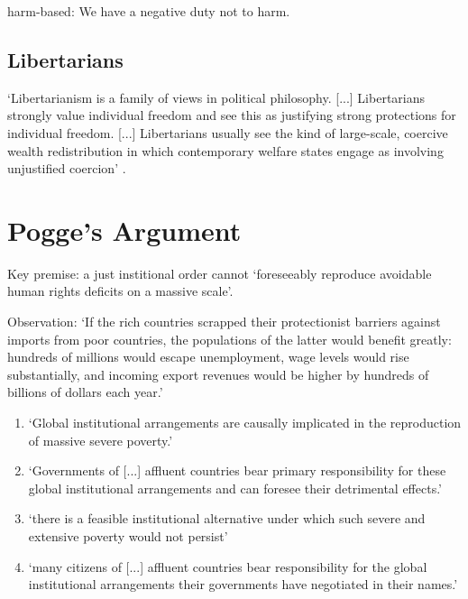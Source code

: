 \documentclass[12pt]{extarticle}
\begin{document}
\begin{multicols*}{3}
harm-based: We have a negative duty not to harm.


\subsection{Libertarians}
‘Libertarianism is a family of views in political philosophy.
[...] Libertarians strongly value individual freedom and see this as justifying
strong protections for individual freedom.
[...] Libertarians usually see the kind of large-scale, coercive wealth
redistribution in which contemporary welfare states engage as involving
unjustified coercion’
\citep{vandervossen:2019_libertarianism}.


 
\section{Pogge’s Argument}
 
Key premise: a just institional order cannot ‘foreseeably reproduce avoidable human rights deficits on a massive scale’.

Observation: ‘If the rich countries scrapped their protectionist barriers against 
imports from poor countries, the populations of the latter would 
benefit greatly: hundreds of millions would escape unemployment, 
wage levels would rise substantially, and incoming export revenues 
would be higher by hundreds of billions of dollars each year.’


\begin{enumerate}

\item ‘Global institutional arrangements
are causally implicated in the reproduction of massive severe poverty.’
 
\item ‘Governments of [...] affluent countries bear primary responsibility for these
global institutional arrangements and can foresee their detrimental
effects.’
 
\item ‘there is a feasible institutional alternative under which such severe and extensive poverty would not persist’
 
\item ‘many citizens of [...] affluent countries bear responsibility
for the global institutional arrangements their governments have
negotiated in their names.’

\end{enumerate}


\end{multicols*}
\end{document}
